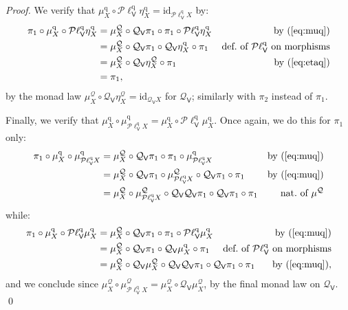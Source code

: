 \documentclass[preprint,12pt]{elsarticle}
\newcommand\identity[1]{\mathrm{id}_{#1}}
\newcommand\Smyth{{\mathcal Q}}
\newcommand\Vt{\mathsf{V}}
\newcommand\SV{\Smyth_{\Vt}}
\newcommand\quasi{\mathrm{q}} %
\newcommand\QL{\Plotkin^\quasi}
\newcommand\QLV{\QL_\Vt}
\newcommand\Plotkin{\mathcal P\ell} %
\begin{document}
\begin{proof}
  We verify that
  $\mu^\quasi_X \circ \QLV {\eta^\quasi_X} = \identity {\QLV X}$ by:
  \begin{align*}
    \pi_1 \circ \mu^\quasi_X \circ \QLV {\eta^\quasi_X}
    & = \mu^\Smyth_X \circ \SV {\pi_1} \circ \pi_1 \circ \QLV {\eta^\quasi_X}
    & \text{by (\ref{eq:muq})} \\
    & = \mu^\Smyth_X \circ \SV {\pi_1} \circ \SV {\eta^\quasi_X} \circ
      \pi_1
    & \text{def.\ of $\QLV$ on morphisms} \\
    & = \mu^\Smyth_X \circ \SV {\eta^\Smyth_X} \circ \pi_1
    & \text{by (\ref{eq:etaq})} \\
    & = \pi_1,
  \end{align*}
  by the monad law
  $\mu^\Smyth_X \circ \SV {\eta^\Smyth_X} = \identity {\SV X}$ for
  $\SV$; similarly with $\pi_2$ instead of $\pi_1$.

  Finally, we verify that $\mu^\quasi_X \circ \mu^\quasi_{\QLV X} =
  \mu^\quasi_X \circ \QLV {\mu^\quasi_X}$.  Once again, we do this for
  $\pi_1$ only:
  \begin{align*}
    \pi_1 \circ \mu^\quasi_X \circ \mu^\quasi_{\QLV X}
    & = \mu^\Smyth_X \circ \SV {\pi_1} \circ \pi_1
      \circ \mu^\quasi_{\QLV X}
    & \text{by (\ref{eq:muq})} \\
    & = \mu^\Smyth_X \circ \SV {\pi_1}
      \circ \mu^\Smyth_{\QLV X} \circ \SV {\pi_1} \circ \pi_1
    & \text{by (\ref{eq:muq})} \\
    & = \mu^\Smyth_X
      \circ \mu^\Smyth_{\QLV X} \circ \SV {\SV {\pi_1}} \circ \SV
      {\pi_1} \circ \pi_1
    & \text{nat.\ of $\mu^\Smyth$}
  \end{align*}
  while:
  \begin{align*}
    \pi_1 \circ \mu^\quasi_X \circ \QLV {\mu^\quasi_X}
    & = \mu^\Smyth_X \circ \SV {\pi_1} \circ \pi_1
      \circ \QLV {\mu^\quasi_X}
    & \text{by (\ref{eq:muq})} \\
    & = \mu^\Smyth_X \circ \SV {\pi_1}
      \circ \SV {\mu^\quasi_X} \circ \pi_1
    & \text{def.\ of $\QLV$ on morphisms} \\
    & = \mu^\Smyth_X
      \circ \SV {\mu^\Smyth_X} \circ \SV {\SV {\pi_1}} \circ \SV
      {\pi_1} \circ \pi_1
      \mskip-150mu
    & \text{by (\ref{eq:muq})},
  \end{align*}
  and we conclude since
  $\mu^\Smyth_X \circ \mu^\Smyth_{\QLV X} = \mu^\Smyth_X \circ \SV
  {\mu^\Smyth_X}$, by the final monad law on $\SV$.  \qed
\end{proof}
\end{document}

